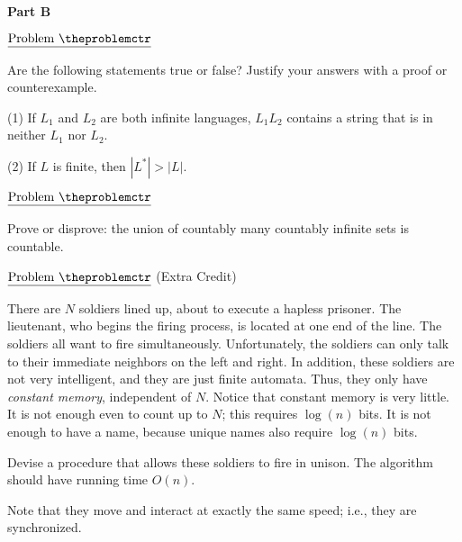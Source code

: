 \documentclass[11pt]{article}
\def\pp{\par\noindent}
\begin{document}
\bigskip
\bigskip
\centerline{\bf Part B}

\addtocounter{problemctr}{1}
\bigskip

\noindent
$\underline{\rm Problem\ \theproblemctr}$\pp Are the following statements true
or false? Justify your answers with a proof or counterexample.

\noindent
(1) If $L_1$ and $L_2$ are both infinite languages, $L_1L_2$ contains a string 
that is in neither $L_1$ nor $L_2$.

\noindent
(2) If $L$ is finite, then $|L^*| > |L|$.


\addtocounter{problemctr}{1}
\bigskip
\noindent
$\underline{\rm Problem\ \theproblemctr}$\pp Prove or disprove: the union of
countably many countably infinite sets is countable. 



\addtocounter{problemctr}{1}
\bigskip
\noindent
$\underline{\rm Problem\ \theproblemctr}$ (Extra Credit)\pp
\noindent
There are $N$ soldiers lined up, about to execute a hapless
prisoner. The lieutenant, who begins the firing process, is
located at one end of the line. The soldiers all want to fire
simultaneously. Unfortunately, the soldiers can only talk to their
immediate neighbors on the left and right. In addition, these
soldiers are not very intelligent, and they are just finite automata.
Thus, they only have {\em constant
memory\/}, independent of $N$. Notice that constant memory is very
little. It is not enough even to count up to $N$; this requires
$\log (n)$ bits. It is not enough to have a name, because unique
names also require $\log (n)$ bits.

\noindent
Devise a procedure that allows these soldiers to fire in unison. The
algorithm should have running time $O(n)$.

\noindent
Note that they move and interact at exactly
the same speed; i.e., they are synchronized.
\end{document}
